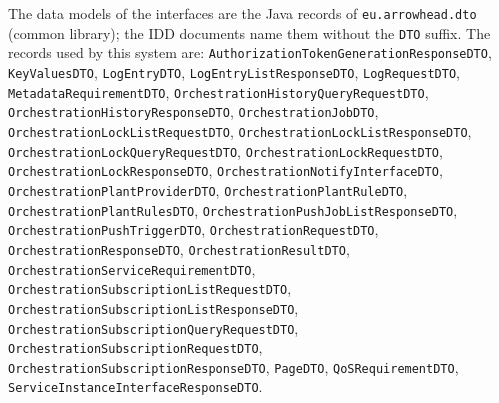 \documentclass[a4paper]{arrowhead}
\begin{document}
The data models of the interfaces are the Java records of \texttt{eu.arrowhead.dto} (common library); the IDD documents name them without the \texttt{DTO} suffix. The records used by this system are: \texttt{Authorization\allowbreak{}Token\allowbreak{}Generation\allowbreak{}Response\allowbreak{}DTO}, \texttt{KeyValuesDTO}, \texttt{LogEntryDTO}, \texttt{Log\allowbreak{}Entry\allowbreak{}List\allowbreak{}Response\allowbreak{}DTO}, \texttt{LogRequestDTO}, \texttt{Metadata\allowbreak{}Requirement\allowbreak{}DTO}, \texttt{Orchestration\allowbreak{}History\allowbreak{}Query\allowbreak{}Request\allowbreak{}DTO}, \texttt{Orchestration\allowbreak{}History\allowbreak{}Response\allowbreak{}DTO}, \texttt{Orchestration\allowbreak{}Job\allowbreak{}DTO}, \texttt{Orchestration\allowbreak{}Lock\allowbreak{}List\allowbreak{}Request\allowbreak{}DTO}, \texttt{Orchestration\allowbreak{}Lock\allowbreak{}List\allowbreak{}Response\allowbreak{}DTO}, \texttt{Orchestration\allowbreak{}Lock\allowbreak{}Query\allowbreak{}Request\allowbreak{}DTO}, \texttt{Orchestration\allowbreak{}Lock\allowbreak{}Request\allowbreak{}DTO}, \texttt{Orchestration\allowbreak{}Lock\allowbreak{}Response\allowbreak{}DTO}, \texttt{Orchestration\allowbreak{}Notify\allowbreak{}Interface\allowbreak{}DTO}, \texttt{Orchestration\allowbreak{}Plant\allowbreak{}Provider\allowbreak{}DTO}, \texttt{Orchestration\allowbreak{}Plant\allowbreak{}Rule\allowbreak{}DTO}, \texttt{Orchestration\allowbreak{}Plant\allowbreak{}Rules\allowbreak{}DTO}, \texttt{Orchestration\allowbreak{}Push\allowbreak{}Job\allowbreak{}List\allowbreak{}Response\allowbreak{}DTO}, \texttt{Orchestration\allowbreak{}Push\allowbreak{}Trigger\allowbreak{}DTO}, \texttt{Orchestration\allowbreak{}Request\allowbreak{}DTO}, \texttt{Orchestration\allowbreak{}Response\allowbreak{}DTO}, \texttt{Orchestration\allowbreak{}Result\allowbreak{}DTO}, \texttt{Orchestration\allowbreak{}Service\allowbreak{}Requirement\allowbreak{}DTO}, \texttt{Orchestration\allowbreak{}Subscription\allowbreak{}List\allowbreak{}Request\allowbreak{}DTO}, \texttt{Orchestration\allowbreak{}Subscription\allowbreak{}List\allowbreak{}Response\allowbreak{}DTO}, \texttt{Orchestration\allowbreak{}Subscription\allowbreak{}Query\allowbreak{}Request\allowbreak{}DTO}, \texttt{Orchestration\allowbreak{}Subscription\allowbreak{}Request\allowbreak{}DTO}, \texttt{Orchestration\allowbreak{}Subscription\allowbreak{}Response\allowbreak{}DTO}, \texttt{PageDTO}, \texttt{QoSRequirementDTO}, \texttt{Service\allowbreak{}Instance\allowbreak{}Interface\allowbreak{}Response\allowbreak{}DTO}.
\end{document}
